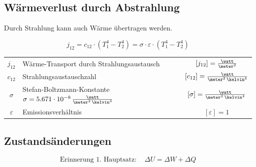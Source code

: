 \subsection{Wärmeverlust durch Abstrahlung}

Durch Strahlung kann auch Wärme übertragen werden.

$$ \boxed{ j_{12} = c_{12} \cdot (T_1^4 - T_2^4) = \sigma \cdot \varepsilon \cdot (T_1^4 - T_2^4) }   $$

\renewcommand{\arraystretch}{1.3}
\begin{tabular}{c l c}
	$j_{12}$ 		& Wärme-Transport durch Strahlungsaustausch 														& $[j_{12}] = \frac{\watt}{\meter^2}$ 				\\
	$c_{12}$ 		& Strahlungsaustauschzahl 																			& $[c_{12}] = \frac{\watt}{\meter^2 \, \kelvin^4}$ 	\\
	$\sigma$ 		& Stefan-Boltzmann-Konstante $\sigma = 5.671 \cdot 10^{-8} \, \frac{\watt}{\meter^2 \, \kelvin^4}$	& $[\sigma] = \frac{\watt}{\meter^2 \, \kelvin^4}$	\\
	$\varepsilon$ 	& Emissionsverhältnis 																				& $[\varepsilon] = 1$
\end{tabular}
\renewcommand{\arraystretch}{1}


\subsection{Zustandsänderungen}

\vspace{-0.2cm}

$$ \text{Erinnerung 1. Hauptsatz}: \quad  \Delta U = \Delta W + \Delta Q $$

